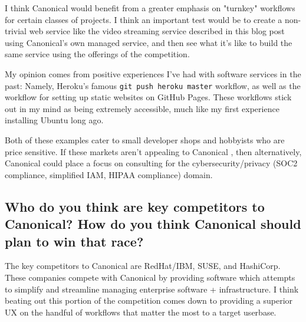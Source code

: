 \documentclass{article}
\begin{document}
I think Canonical would benefit from a greater emphasis on "turnkey"
workflows for certain classes of projects. I think an important test
would be to create a non-trivial web service like the video streaming
service described in this blog post\cite{streaming_blog} using Canonical's
own managed service, and then see what it's like to build the same
service using the offerings of the competition.

My opinion comes from positive experiences I've had with
software services in the past: Namely, Heroku's famous
\texttt{git push heroku master} workflow, as well as the workflow for setting
up static websites on GitHub Pages. These workflows stick out in my mind
as being extremely accessible, much like my first experience installing
Ubuntu long ago.

Both of these examples cater to small developer shops and hobbyists who are
price sensitive. If these markets aren't appealing to Canonical , then
alternatively, Canonical could place a focus on consulting for the
cybersecurity/privacy (SOC2 compliance, simplified IAM, HIPAA compliance)
domain.

\subsection{Who do you think are key competitors to Canonical? How do you think
  Canonical should plan to win that race?}

The key competitors to Canonical are RedHat/IBM, SUSE, and HashiCorp. These
companies compete with Canonical by providing software which attempts to
simplify and streamline managing enterprise software + infrastructure. I think
beating out this portion of the competition comes down to providing a superior
UX on the handful of workflows that matter the most to a target userbase.




\end{document}
